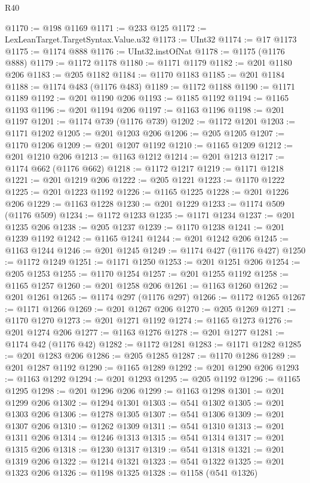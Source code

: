 \begin{lexlean}{R40}
\begin{coremodule}
@1170 := @198 @1169
@1171 := @233 @125
@1172 := LexLeanTarget.TargetSyntax.Value.u32
@1173 := UInt32
@1174 := @17 @1173
@1175 := @1174 @888
@1176 := UInt32.instOfNat
@1178 := @1175 (@1176 @888)
@1179 := @1172 @1178
@1180 := @1171 @1179
@1182 := @201 @1180 @206
@1183 := @205 @1182
@1184 := @1170 @1183
@1185 := @201 @1184
@1188 := @1174 @483 (@1176 @483)
@1189 := @1172 @1188
@1190 := @1171 @1189
@1192 := @201 @1190 @206
@1193 := @1185 @1192
@1194 := @1165 @1193
@1196 := @201 @1194 @206
@1197 := @1163 @1196
@1198 := @201 @1197
@1201 := @1174 @739 (@1176 @739)
@1202 := @1172 @1201
@1203 := @1171 @1202
@1205 := @201 @1203 @206
@1206 := @205 @1205
@1207 := @1170 @1206
@1209 := @201 @1207 @1192
@1210 := @1165 @1209
@1212 := @201 @1210 @206
@1213 := @1163 @1212
@1214 := @201 @1213
@1217 := @1174 @662 (@1176 @662)
@1218 := @1172 @1217
@1219 := @1171 @1218
@1221 := @201 @1219 @206
@1222 := @205 @1221
@1223 := @1170 @1222
@1225 := @201 @1223 @1192
@1226 := @1165 @1225
@1228 := @201 @1226 @206
@1229 := @1163 @1228
@1230 := @201 @1229
@1233 := @1174 @509 (@1176 @509)
@1234 := @1172 @1233
@1235 := @1171 @1234
@1237 := @201 @1235 @206
@1238 := @205 @1237
@1239 := @1170 @1238
@1241 := @201 @1239 @1192
@1242 := @1165 @1241
@1244 := @201 @1242 @206
@1245 := @1163 @1244
@1246 := @201 @1245
@1249 := @1174 @427 (@1176 @427)
@1250 := @1172 @1249
@1251 := @1171 @1250
@1253 := @201 @1251 @206
@1254 := @205 @1253
@1255 := @1170 @1254
@1257 := @201 @1255 @1192
@1258 := @1165 @1257
@1260 := @201 @1258 @206
@1261 := @1163 @1260
@1262 := @201 @1261
@1265 := @1174 @297 (@1176 @297)
@1266 := @1172 @1265
@1267 := @1171 @1266
@1269 := @201 @1267 @206
@1270 := @205 @1269
@1271 := @1170 @1270
@1273 := @201 @1271 @1192
@1274 := @1165 @1273
@1276 := @201 @1274 @206
@1277 := @1163 @1276
@1278 := @201 @1277
@1281 := @1174 @42 (@1176 @42)
@1282 := @1172 @1281
@1283 := @1171 @1282
@1285 := @201 @1283 @206
@1286 := @205 @1285
@1287 := @1170 @1286
@1289 := @201 @1287 @1192
@1290 := @1165 @1289
@1292 := @201 @1290 @206
@1293 := @1163 @1292
@1294 := @201 @1293
@1295 := @205 @1192
@1296 := @1165 @1295
@1298 := @201 @1296 @206
@1299 := @1163 @1298
@1301 := @201 @1299 @206
@1302 := @1294 @1301
@1303 := @541 @1302
@1305 := @201 @1303 @206
@1306 := @1278 @1305
@1307 := @541 @1306
@1309 := @201 @1307 @206
@1310 := @1262 @1309
@1311 := @541 @1310
@1313 := @201 @1311 @206
@1314 := @1246 @1313
@1315 := @541 @1314
@1317 := @201 @1315 @206
@1318 := @1230 @1317
@1319 := @541 @1318
@1321 := @201 @1319 @206
@1322 := @1214 @1321
@1323 := @541 @1322
@1325 := @201 @1323 @206
@1326 := @1198 @1325
@1328 := @1158 (@541 @1326)

\end{coremodule}
\end{lexlean}
